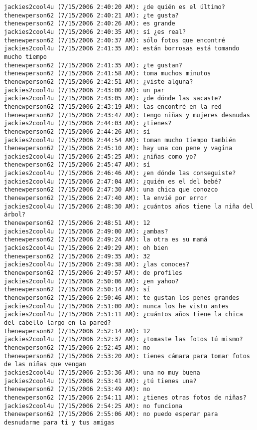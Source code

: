 \begin{verbatim}
jackies2cool4u (7/15/2006 2:40:20 AM): ¿de quién es el último?
thenewperson62 (7/15/2006 2:40:21 AM): ¿te gusta?
thenewperson62 (7/15/2006 2:40:26 AM): es grande
jackies2cool4u (7/15/2006 2:40:35 AM): sí ¿es real?
thenewperson62 (7/15/2006 2:40:37 AM): sólo fotos que encontré
jackies2cool4u (7/15/2006 2:41:35 AM): están borrosas está tomando mucho tiempo
thenewperson62 (7/15/2006 2:41:35 AM): ¿te gustan?
thenewperson62 (7/15/2006 2:41:58 AM): toma muchos minutos
thenewperson62 (7/15/2006 2:42:51 AM): ¿viste alguna?
jackies2cool4u (7/15/2006 2:43:00 AM): un par
jackies2cool4u (7/15/2006 2:43:05 AM): ¿de dónde las sacaste?
thenewperson62 (7/15/2006 2:43:19 AM): las encontré en la red
thenewperson62 (7/15/2006 2:43:47 AM): tengo niñas y mujeres desnudas
jackies2cool4u (7/15/2006 2:44:03 AM): ¿tienes?
thenewperson62 (7/15/2006 2:44:26 AM): sí
jackies2cool4u (7/15/2006 2:44:54 AM): toman mucho tiempo también
thenewperson62 (7/15/2006 2:45:10 AM): hay una con pene y vagina
jackies2cool4u (7/15/2006 2:45:25 AM): ¿niñas como yo?
thenewperson62 (7/15/2006 2:45:47 AM): sí
jackies2cool4u (7/15/2006 2:46:46 AM): ¿en dónde las conseguiste?
jackies2cool4u (7/15/2006 2:47:04 AM): ¿quién es el del bebé?
thenewperson62 (7/15/2006 2:47:30 AM): una chica que conozco
thenewperson62 (7/15/2006 2:47:40 AM): la envié por error
jackies2cool4u (7/15/2006 2:48:30 AM): ¿cuántos años tiene la niña del árbol?
thenewperson62 (7/15/2006 2:48:51 AM): 12
jackies2cool4u (7/15/2006 2:49:00 AM): ¿ambas?
thenewperson62 (7/15/2006 2:49:24 AM): la otra es su mamá
jackies2cool4u (7/15/2006 2:49:29 AM): oh bien
thenewperson62 (7/15/2006 2:49:35 AM): 32
jackies2cool4u (7/15/2006 2:49:38 AM): ¿las conoces?
thenewperson62 (7/15/2006 2:49:57 AM): de profiles
jackies2cool4u (7/15/2006 2:50:06 AM): ¿en yahoo?
thenewperson62 (7/15/2006 2:50:14 AM): sí
thenewperson62 (7/15/2006 2:50:46 AM): te gustan los penes grandes
jackies2cool4u (7/15/2006 2:51:00 AM): nunca los he visto antes 
jackies2cool4u (7/15/2006 2:51:11 AM): ¿cuántos años tiene la chica del cabello largo en la pared?
thenewperson62 (7/15/2006 2:52:14 AM): 12
jackies2cool4u (7/15/2006 2:52:37 AM): ¿tomaste las fotos tú mismo?
thenewperson62 (7/15/2006 2:52:45 AM): no
thenewperson62 (7/15/2006 2:53:20 AM): tienes cámara para tomar fotos de las niñas que vengan
jackies2cool4u (7/15/2006 2:53:36 AM): una no muy buena
jackies2cool4u (7/15/2006 2:53:41 AM): ¿tú tienes una?
thenewperson62 (7/15/2006 2:53:49 AM): no
thenewperson62 (7/15/2006 2:54:11 AM): ¿tienes otras fotos de niñas?
jackies2cool4u (7/15/2006 2:54:25 AM): no funciona
thenewperson62 (7/15/2006 2:55:06 AM): no puedo esperar para desnudarme para ti y tus amigas

\end{verbatim}
